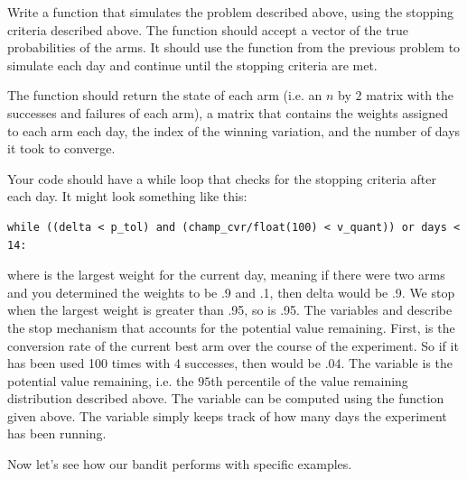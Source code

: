 \begin{problem}
Write a function that simulates the problem described above, using the stopping criteria described above.  The function should accept a vector of the true probabilities of the arms.  It should use the function from the previous problem to simulate each day and continue until the stopping criteria are met.

The function should return the state of each arm (i.e. an $n$ by $2$ matrix with the successes and failures of each arm), a matrix that contains the weights assigned to each arm each day, the index of the winning variation, and the number of days it took to converge.

Your code should have a while loop that checks for the stopping criteria after each day.  It might look something like this:
\newpage
\begin{lstlisting}[style = python]
while ((delta < p_tol) and (champ_cvr/float(100) < v_quant)) or days < 14:
\end{lstlisting}
where  is the largest weight for the current day, meaning if there were two arms and you determined the weights to be .9 and .1, then delta would be .9.  We stop when the largest weight is greater than .95, so  is .95.  The variables  and  describe the stop mechanism that accounts for the potential value remaining.  First,  is the conversion rate of the current best arm over the course of the experiment.  So if it has been used 100 times with 4 successes, then  would be .04.  The variable  is the potential value remaining, i.e. the $95$th percentile of the value remaining distribution described above.  The variable  can be computed using the  function given above.
The  variable simply keeps track of how many days the experiment has been running.
\end{problem}

Now let's see how our bandit performs with specific examples.

